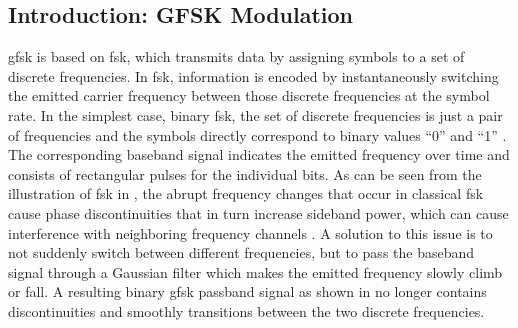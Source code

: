 \subsection{Introduction: GFSK Modulation}
\gls{gfsk} is based on \gls{fsk}, which transmits data by assigning symbols to a set of discrete frequencies.
In \gls{fsk}, information is encoded by instantaneously switching the emitted carrier frequency between those discrete frequencies at the symbol rate.
In the simplest case, binary \gls{fsk}, the set of discrete frequencies is just a pair of frequencies and the symbols directly correspond to binary values ``0'' and ``1'' \cite[Section 9.5]{commsys}.
The corresponding baseband signal indicates the emitted frequency over time and consists of rectangular pulses for the individual bits.
As can be seen from the illustration of \gls{fsk} in , the abrupt frequency changes that occur in classical \gls{fsk} cause phase discontinuities that in turn increase sideband power, which can cause interference with neighboring frequency channels \cite[Section 9.6.1]{commsys}.
A solution to this issue is to not suddenly switch between different frequencies, but to pass the baseband signal through a Gaussian filter which makes the emitted frequency slowly climb or fall.
A resulting binary \gls{gfsk} passband signal as shown in  no longer contains discontinuities and smoothly transitions between the two discrete frequencies.

